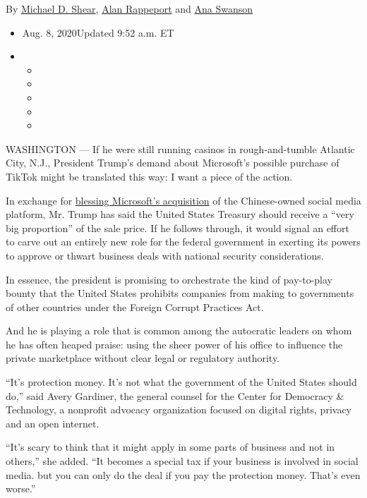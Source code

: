 By \href{https://www.nytimes.com/by/michael-d-shear}{Michael D. Shear},
\href{https://www.nytimes.com/by/alan-rappeport}{Alan Rappeport} and
\href{https://www.nytimes.com/by/ana-swanson}{Ana Swanson}

\begin{itemize}
\item
  Aug. 8, 2020Updated 9:52 a.m. ET
\item
  \begin{itemize}
  \item
  \item
  \item
  \item
  \item
  \end{itemize}
\end{itemize}

WASHINGTON --- If he were still running casinos in rough-and-tumble
Atlantic City, N.J., President Trump's demand about Microsoft's possible
purchase of TikTok might be translated this way: I want a piece of the
action.

In exchange for
\href{https://www.nytimes.com/2020/08/03/technology/trump-tiktok-microsoft.html}{blessing
Microsoft's acquisition} of the Chinese-owned social media platform, Mr.
Trump has said the United States Treasury should receive a ``very big
proportion'' of the sale price. If he follows through, it would signal
an effort to carve out an entirely new role for the federal government
in exerting its powers to approve or thwart business deals with national
security considerations.

In essence, the president is promising to orchestrate the kind of
pay-to-play bounty that the United States prohibits companies from
making to governments of other countries under the Foreign Corrupt
Practices Act.

And he is playing a role that is common among the autocratic leaders on
whom he has often heaped praise: using the sheer power of his office to
influence the private marketplace without clear legal or regulatory
authority.

``It's protection money. It's not what the government of the United
States should do,'' said Avery Gardiner, the general counsel for the
Center for Democracy \& Technology, a nonprofit advocacy organization
focused on digital rights, privacy and an open internet.

``It's scary to think that it might apply in some parts of business and
not in others,'' she added. ``It becomes a special tax if your business
is involved in social media. but you can only do the deal if you pay the
protection money. That's even worse.''

